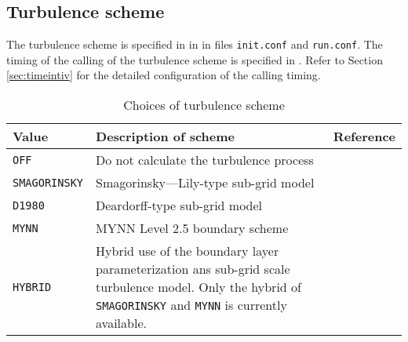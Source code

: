 \subsection{Turbulence scheme} \label{subsec:basic_usel_turbulence}

The turbulence scheme is specified in  in  in files \verb|init.conf| and \verb|run.conf|. The timing of the calling of the turbulence scheme is specified in . Refer to Section \ref{sec:timeintiv} for the detailed configuration of the calling timing.

\begin{table}[h]
\begin{center}
  \caption{Choices of turbulence scheme}
  \label{tab:nml_atm_tb}
  \begin{tabularx}{150mm}{lXX} \hline
    \rowcolor[gray]{0.9}  Value & Description of scheme & Reference\\ \hline
      \verb|OFF|          & Do not calculate the turbulence process &  \\
      \verb|SMAGORINSKY|  & Smagorinsky—Lily-type sub-grid model & \citet{smagorinsky_1963,lilly_1962,Brown_etal_1994,Scotti_1993} \\
      \verb|D1980|        & Deardorff-type sub-grid model & \citet{Deardorff_1980} \\
      \verb|MYNN|         & MYNN Level 2.5 boundary scheme & \citet{my_1982,nakanishi_2004} \\
      \verb|HYBRID|       & Hybrid use of the boundary layer parameterization ans sub-grid scale turbulence model. Only the hybrid of \verb|SMAGORINSKY| and \verb|MYNN| is currently available.\\
    \hline
  \end{tabularx}
\end{center}
\end{table}

